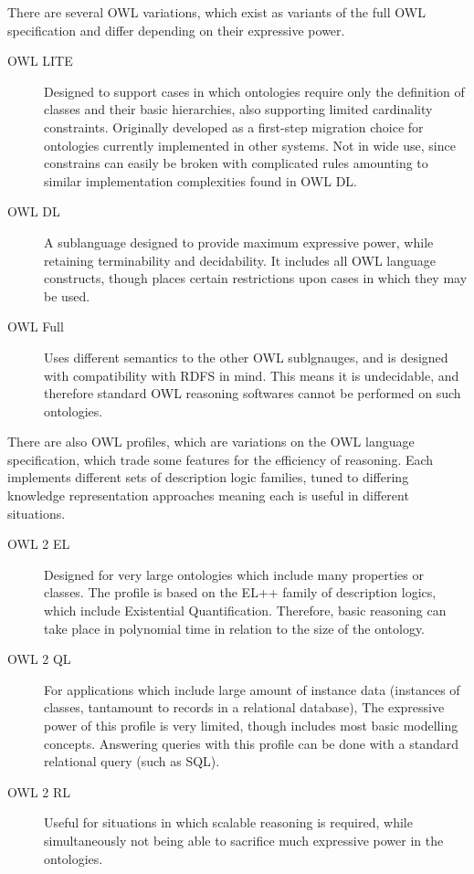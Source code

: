 \documentclass{article}
\begin{document}
There are several OWL variations, which exist as variants of the full OWL
specification and differ depending on their expressive power.

\begin{description}
    \item[OWL LITE] Designed to support cases in which ontologies require only
    the definition of classes and their basic hierarchies, also supporting
    limited cardinality constraints. Originally developed as a first-step
    migration choice for ontologies currently implemented in other systems. Not
    in wide use, since constrains can easily be broken with complicated rules
    amounting to similar implementation complexities found in OWL DL.
    \item[OWL DL] A sublanguage designed to provide maximum expressive power,
    while retaining terminability and decidability. It includes all OWL language
    constructs, though places certain restrictions upon cases in which they may
    be used. 
    \item[OWL Full] Uses different semantics to the other OWL sublgnauges, and
    is designed with compatibility with RDFS in mind. This means it is
    undecidable, and therefore standard OWL reasoning softwares cannot be
    performed on such ontologies.
\end{description}

There are also OWL profiles\cite{owlprofiles}, which are variations on the OWL
language specification, which trade some features for the efficiency of reasoning.
Each implements different sets of description logic families, tuned to differing
knowledge representation approaches meaning each is useful in different situations.

\begin{description}
    \item[OWL 2 EL] Designed for very large ontologies which include many
    properties or classes. The profile is based on the EL++ family of 
    description logics, which include Existential Quantification. Therefore,
    basic reasoning can take place in polynomial time in relation to the size of
    the ontology.
    \item[OWL 2 QL] For applications which include large amount of instance data
    (instances of classes, tantamount to records in a relational database), The
    expressive power of this profile is very limited, though includes most basic
    modelling concepts. Answering queries with this profile can be done with a
    standard relational query (such as SQL).
    \item[OWL 2 RL] Useful for situations in which scalable reasoning is
    required, while simultaneously not being able to sacrifice much expressive
    power in the ontologies.
\end{description}
\end{document}
